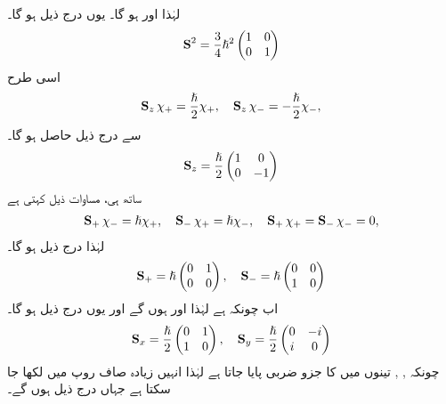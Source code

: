  لہٰذا  اور  ہو گا۔ یوں درج ذیل ہو گا۔
 \begin{align} 
\operatorname{\mathbf{S}}^2= \frac{3}{4}\hslash^2 \begin{pmatrix} 1&0 \\ 0&1 \end{pmatrix} 
 \end{align} 
اسی طرح 
\begin{align} 
 \operatorname{\mathbf{S}}_{z}\chi_{+}=\frac{\hslash}{2}\chi_{+}, \quad \operatorname{\mathbf{S}}_{z} \chi_{-}=-\frac{\hslash}{2}\chi_{-}, 
 \end{align}
سے درج ذیل حاصل ہو گا۔
\begin{align}\label{مساوات_تین_ابعادی_زیڈ_چکری}
 \operatorname{\mathbf{S}}_{z}= \frac{\hslash}{2}\begin{pmatrix} 1&0 \\ 0&-1 \end{pmatrix} 
 \end{align}
ساتھ ہی، مساوات  ذیل کہتی ہے
\begin{align*} 
 \operatorname{\mathbf{S}}_{+} \chi_{-}=\hslash \chi_+, \quad \operatorname{\mathbf{S}}_{-}\chi_{+}=\hslash \chi_- ,\quad \operatorname{\mathbf{S}}_{+} \chi_{+}= \operatorname{\mathbf{S}}_{-} \chi_{-}=0, 
 \end{align*}
لہٰذا درج ذیل ہو گا۔
\begin{align}\label{مساوات_تین_ابعادی_چکر_رفعت_وغیرہ}
 \operatorname{\mathbf{S}}_{+}=\hslash\begin{pmatrix} 0&1 \\ 0&0 \end{pmatrix} , \quad \operatorname{\mathbf{S}}_{-}=\hslash\begin{pmatrix}0&0 \\ 1&0 \end{pmatrix} 
 \end{align}
 اب چونکہ  ہے لہٰذا  اور  ہوں گے اور یوں درج ذیل ہو گا۔
\begin{align}\label{مساوات_تین_ابعادی_دو_چکری} 
 \operatorname{\mathbf{S}}_{x}=\frac{\hslash}{2}\begin{pmatrix} 0&1 \\1&0 \end{pmatrix} , \quad \operatorname{\mathbf{S}}_{y}=\frac{\hslash}{2}\begin{pmatrix} 0&-i \\ i& 0 \end{pmatrix}
 \end{align}
چونکہ  ,  ,  تینوں میں  کا جزو ضربی پایا جاتا ہے لہٰذا انہیں زیادہ صاف روپ  میں لکھا جا سکتا ہے جہاں درج ذیل ہوں گے۔
